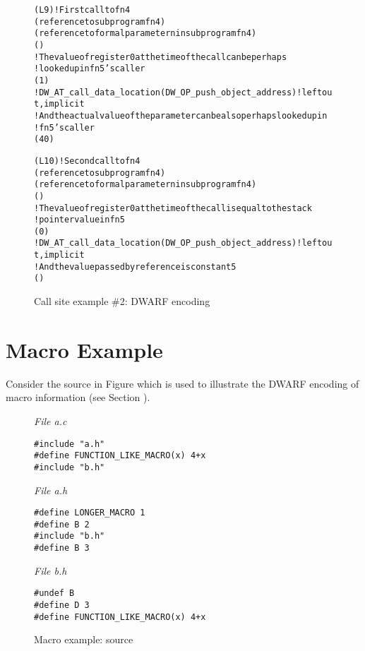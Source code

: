 \begin{figure}[h]
\begin{dwflisting}
\begin{alltt}

\DWTAGcallsite
    \DWATcallreturnpc(L9) ! First call to fn4
    \DWATcallorigin(reference to subprogram fn4)
    \DWTAGcallsiteparameter
        \DWATcallparameter(reference to formal parameter n in subprogram fn4)
        \DWATlocation(\DWOPregzero)
        ! The value of register 0 at the time of the call can be perhaps 
        !   looked up in fn5's caller
        \DWATcallvalue(\DWOPentryvalue{} 1 \DWOPregzero)
        ! DW_AT_call_data_location(DW_OP_push_object_address) ! left out, implicit
        ! And the actual value of the parameter can be also perhaps looked up in
        ! fn5's caller
        \DWATcalldatavalue(\DWOPentryvalue{} 4 \DWOPbregzero{} 0 )
        
\DWTAGcallsite
    \DWATcallreturnpc(L10) ! Second call to fn4
    \DWATcallorigin(reference to subprogram fn4)
    \DWTAGcallsiteparameter
        \DWATcallparameter(reference to formal parameter n in subprogram fn4)
        \DWATlocation(\DWOPregzero)
        ! The value of register 0 at the time of the call is equal to the stack
        ! pointer value in fn5
        \DWATcallvalue(\DWOPbregthree{} 0)
        ! DW_AT_call_data_location(DW_OP_push_object_address) ! left out, implicit
        ! And the value passed by reference is constant 5
        \DWATcalldatavalue(\DWOPlitfive)
        
\end{alltt}
\end{dwflisting}
\caption{Call site example \#2: DWARF encoding}
\label{fig:callsiteexample2dwarf}
\end{figure}


\clearpage
\section{Macro Example}
\label{macroexample}
Consider the  source in Figure 
 which is used to illustrate the
DWARF encoding of macro information (see Section ).

\begin{figure}[h]
\textit{File a.c}
\begin{lstlisting}
#include "a.h"
#define FUNCTION_LIKE_MACRO(x) 4+x
#include "b.h"
\end{lstlisting}
\vspace{7mm}
\textit{File a.h}
\begin{lstlisting}
#define LONGER_MACRO 1
#define B 2
#include "b.h"
#define B 3
\end{lstlisting}
\vspace{7mm}
\textit{File b.h}
\begin{lstlisting}
#undef B
#define D 3
#define FUNCTION_LIKE_MACRO(x) 4+x
\end{lstlisting}
\caption{Macro example: source}
\label{ref:macroexamplesource}
\end{figure}

